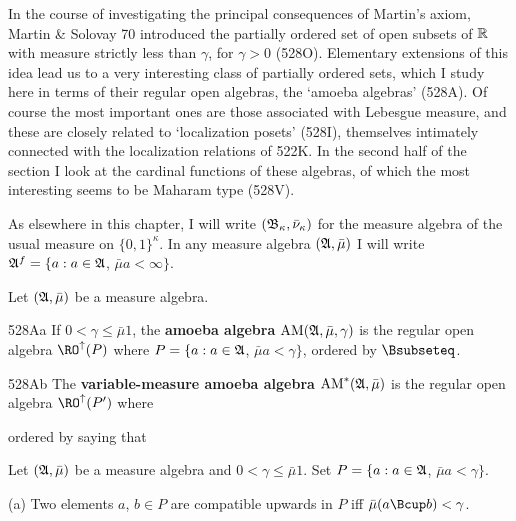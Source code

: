 \def\AM{\mathop{\text{AM}}}


In the course of investigating the principal consequences of Martin's
axiom, {\smc Martin \& Solovay 70} introduced the partially ordered set
of open subsets of $\Bbb R$ with measure strictly less than $\gamma$,
for $\gamma>0$ (528O).   Elementary extensions of this idea lead us to a
very interesting class of partially ordered sets, which I study here in
terms of their regular open algebras, the `amoeba algebras' (528A).   Of
course the most important ones are those associated with Lebesgue
measure, and these are closely related to `localization posets'
(528I), themselves intimately connected with the localization relations of
522K.   In the second half of the section I look at the cardinal functions
of these algebras, of which the most interesting seems to be Maharam type
(528V).

As elsewhere in this chapter, I will write
$(\frak B_{\kappa},\bar\nu_{\kappa})$ for the measure algebra of the
usual measure on $\{0,1\}^{\kappa}$.   In any measure algebra
$(\frak A,\bar\mu)$
I will write $\frak A^f=\{a:a\in\frak A$, $\bar\mu a<\infty\}$.

Let $(\frak A,\bar\mu)$ be a measure algebra.

\spheader 528Aa If $0<\gamma\le\bar\mu 1$, the {\bf amoeba algebra}
$\AM(\frak A,\bar\mu,\gamma)$ is the regular open algebra
$\RO^{\uparrow}(P)$ where $P=\{a:a\in\frak A$, $\bar\mu a<\gamma\}$,
ordered by $\Bsubseteq$.

\spheader 528Ab
The {\bf variable-measure amoeba algebra}
$\AM^*(\frak A,\bar\mu)$ is the regular open
algebra $\RO^{\uparrow}(P')$ where


\noindent ordered by saying that


 Let $(\frak A,\bar\mu)$ be a measure algebra
and $0<\gamma\le\bar\mu 1$.   Set
$P=\{a:a\in\frak A$, $\bar\mu a<\gamma\}$.

(a) Two elements $a$, $b\in P$ are compatible upwards in $P$ iff
$\bar\mu(a\Bcup b)<\gamma$.

